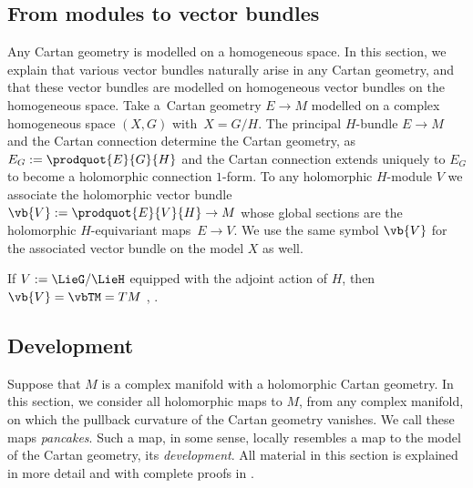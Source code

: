 \documentclass[pdftex]{sigma}
\numberwithin{equation}{section}
\begin{document}
\subsection{From modules to vector bundles}
Any Cartan geometry is modelled on a homogeneous space.
In this section, we explain that various vector bundles naturally arise in any Cartan geometry, and that these vector bundles are modelled on homogeneous vector
bundles \cite[Section 10]{mckay2023introduction} on the homogeneous space.
Take a~Cartan geometry $E \to M$ modelled on a complex homogeneous space $(X, G)$ with~${X = G/H}$.
The principal $H$-bundle $E \to M$ and the Cartan connection determine the Cartan geometry,
as $E_G := \prodquot{E}{G}{H}$ and the Cartan connection extends uniquely to $E_G$ to become a holomorphic connection $1$-form.
To any holomorphic $H$-module $V$ we associate the holomorphic vector bundle~$\vb{V} := \prodquot{E}{V}{H} \to M$
whose global sections are the holomorphic $H$-equivariant maps~${E \to V}$.
We use the same symbol $\vb{V}$ for the associated vector bundle on the model $X$ as well.

\begin{Example} If $V := \LieG/\LieH$ equipped with the adjoint action of $H$, then $\vb{V} = \vbTM = TM$
\cite[Proposition 1]{mckay2023introduction}, \cite[Theorem 3.15]{Sharpe:1997}.
\end{Example}

\subsection{Development}\label{subsection:Development}
Suppose that $M$ is a complex manifold with a holomorphic Cartan geometry.
In this section, we consider all holomorphic maps to $M$, from any complex manifold, on which the pullback curvature of the Cartan geometry vanishes.
We call these maps \emph{pancakes}.
Such a map, in some sense, locally resembles a map to the model of the Cartan geometry, its \emph{development}.
All material in this section is explained in more detail and with complete proofs
in \cite[Section 7]{mckay2023introduction}.
\end{document}
